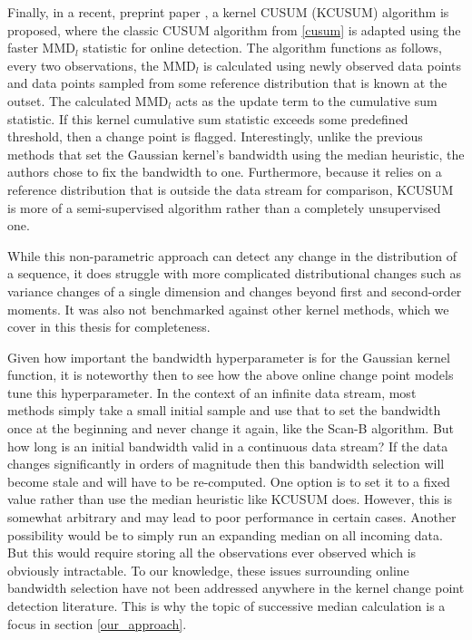 Finally, in a recent, preprint paper \cite{flynn2019change}, a kernel CUSUM (KCUSUM) algorithm is proposed, where the classic CUSUM algorithm from \ref{cusum} is adapted using the faster MMD$_l$ statistic for online detection. The algorithm functions as follows, every two observations, the MMD$_l$ is calculated using newly observed data points and data points sampled from some reference distribution that is known at the outset. The calculated MMD$_l$ acts as the update term to the cumulative sum statistic. If this kernel cumulative sum statistic exceeds some predefined threshold, then a change point is flagged. Interestingly, unlike the previous methods that set the Gaussian kernel's bandwidth using the median heuristic, the authors chose to fix the bandwidth to one. Furthermore, because it relies on a reference distribution that is outside the data stream for comparison, KCUSUM is more of a semi-supervised algorithm rather than a completely unsupervised one. %

While this non-parametric approach can detect any change in the distribution of a sequence, it does struggle with more complicated distributional changes such as variance changes of a single dimension and changes beyond first and second-order moments. It was also not benchmarked against other kernel methods, which we cover in this thesis for completeness.

Given how important the bandwidth hyperparameter is for the Gaussian kernel function, it is noteworthy then to see how the above online change point models tune this hyperparameter. In the context of an infinite data stream, most methods simply take a small initial sample and use that to set the bandwidth once at the beginning and never change it again, like the Scan-B algorithm. But how long is an initial bandwidth valid in a continuous data stream? If the data changes significantly in orders of magnitude then this bandwidth selection will become stale and will have to be re-computed. One option is to set it to a fixed value rather than use the median heuristic like KCUSUM does. However, this is somewhat arbitrary and may lead to poor performance in certain cases. Another possibility would be to simply run an expanding median on all incoming data. But this would require storing all the observations ever observed which is obviously intractable. To our knowledge, these issues surrounding online bandwidth selection have not been addressed anywhere in the kernel change point detection literature. This is why the topic of successive median calculation is a focus in section \ref{our_approach}.

